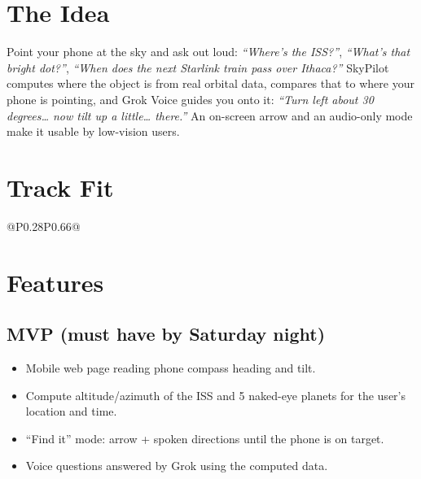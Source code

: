 \documentclass[11pt]{article}
\begin{document}

\section{The Idea}
Point your phone at the sky and ask out loud: \emph{``Where's the ISS?''},
\emph{``What's that bright dot?''}, \emph{``When does the next Starlink train pass
over Ithaca?''} SkyPilot computes where the object is from real orbital data,
compares that to where your phone is pointing, and Grok Voice guides you onto it:
\emph{``Turn left about 30 degrees\ldots{} now tilt up a little\ldots{} there.''}
An on-screen arrow and an audio-only mode make it usable by low-vision users.

\section{Track Fit}
\begin{tabular}{@{}P{0.28\textwidth}P{0.66\textwidth}@{}}
\toprule
{}
\bottomrule
\end{tabular}

\section{Features}
\subsection{MVP (must have by Saturday night)}
\begin{itemize}
  \item Mobile web page reading phone compass heading and tilt.
  \item Compute altitude/azimuth of the ISS and 5 naked-eye planets for the user's location and time.
  \item ``Find it'' mode: arrow + spoken directions until the phone is on target.
  \item Voice questions answered by Grok using the computed data.
\end{itemize}
\end{document}
